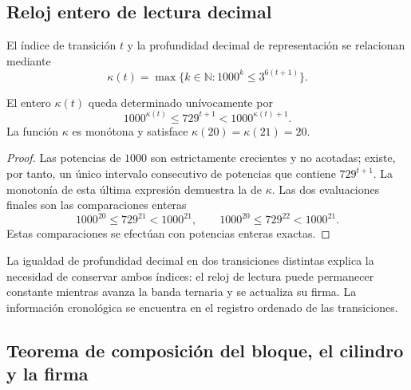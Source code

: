 

\subsection{Reloj entero de lectura decimal}

\begin{definition}
El índice de transición \(t\) y la profundidad decimal de representación se
relacionan mediante
\begin{equation}
 \kappa(t)=\max\{k\in\mathbb N:1000^k\leq3^{6(t+1)}\}.
 \label{act21:eq:df-reloj}
\end{equation}
\end{definition}

\begin{proposition}
\label{act21:prop:df-reloj}
El entero \(\kappa(t)\) queda determinado unívocamente por
\begin{equation}
 1000^{\kappa(t)}\leq729^{t+1}<1000^{\kappa(t)+1}.
 \label{act21:eq:df-reloj-cotas}
\end{equation}
La función \(\kappa\) es monótona y satisface
\(\kappa(20)=\kappa(21)=20\).
\end{proposition}

\begin{proof}
Las potencias de \(1000\) son estrictamente crecientes y no acotadas;
existe, por tanto, un único intervalo consecutivo de potencias que
contiene \(729^{t+1}\). La monotonía de esta última expresión demuestra
la de \(\kappa\). Las dos evaluaciones finales son las comparaciones
enteras
\[
 1000^{20}\leq729^{21}<1000^{21},\qquad
 1000^{20}\leq729^{22}<1000^{21}.
\]
Estas comparaciones se efectúan con potencias enteras exactas.
\end{proof}

La igualdad de profundidad decimal en dos transiciones distintas explica
la necesidad de conservar ambos índices: el reloj de lectura puede
permanecer constante mientras avanza la banda ternaria y se actualiza su
firma. La información cronológica se encuentra en el registro ordenado
de las transiciones.

\subsection{Teorema de composición del bloque, el cilindro y la firma}

